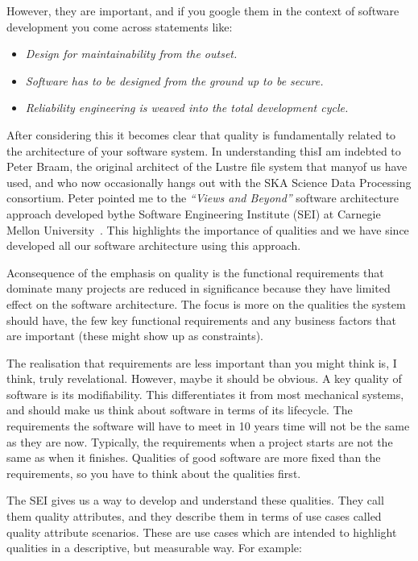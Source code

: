 \documentclass[11pt,twoside]{article}
\begin{document}
However, they are important, and if you google them in the context of software 
development you come across statements like:

\begin{itemize}
	\item \emph{Design for maintainability from the outset.}
	\item \emph{Software has to be designed from the ground up to be secure.}
	\item \emph{Reliability engineering is weaved into the total development cycle.}
\end{itemize}

After considering this it becomes clear that quality is fundamentally related to 
the architecture of your software system. In understanding thisI am indebted to Peter 
Braam, the original architect of the Lustre file system that manyof us have used, and 
who now occasionally hangs out with the SKA Science Data Processing consortium. 
Peter pointed me to the \emph{``Views and Beyond''} software architecture approach developed 
bythe Software Engineering Institute (SEI) at Carnegie Mellon University~\citep{VandB}. This highlights the importance of qualities and we have since developed all our 
software architecture using this approach. 

Aconsequence of the emphasis on quality is the functional requirements that dominate 
many projects are reduced in significance because they have limited effect on 
the software architecture. The focus is more on the qualities the system should have, 
the few key functional requirements and any business factors that are important (these 
might show up as constraints). 

The realisation that requirements are less important than you might think is, I 
think, truly revelational. However, maybe it should be obvious. A key quality of 
software is its modifiability. This differentiates it from most mechanical systems, and 
should make us think about software in terms of its lifecycle. The requirements the 
software will have to meet in 10 years time will not be the same as they are now. Typically, 
the requirements when a project starts are not the same as when it finishes. Qualities 
of good software are more fixed than the requirements, so you have to think about the 
qualities first.

The SEI gives us a way to develop and understand these qualities. They call them 
quality attributes, and they describe them in terms of use cases called quality attribute 
scenarios. These are use cases which are intended to highlight qualities in a descriptive, 
but measurable way. For example: 
\end{document}
